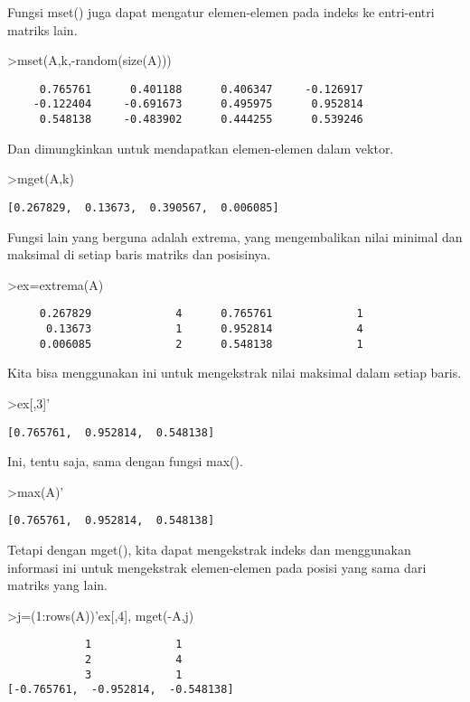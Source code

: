 \documentclass[
]{book}
\begin{document}
Fungsi mset() juga dapat mengatur elemen-elemen pada indeks ke entri-entri matriks lain.

\textgreater mset(A,k,-random(size(A)))

\begin{verbatim}
     0.765761      0.401188      0.406347     -0.126917 
    -0.122404     -0.691673      0.495975      0.952814 
     0.548138     -0.483902      0.444255      0.539246 
\end{verbatim}

Dan dimungkinkan untuk mendapatkan elemen-elemen dalam vektor.

\textgreater mget(A,k)

\begin{verbatim}
[0.267829,  0.13673,  0.390567,  0.006085]
\end{verbatim}

Fungsi lain yang berguna adalah extrema, yang mengembalikan nilai minimal dan maksimal di setiap baris matriks dan posisinya.

\textgreater ex=extrema(A)

\begin{verbatim}
     0.267829             4      0.765761             1 
      0.13673             1      0.952814             4 
     0.006085             2      0.548138             1 
\end{verbatim}

Kita bisa menggunakan ini untuk mengekstrak nilai maksimal dalam setiap baris.

\textgreater ex{[},3{]}'

\begin{verbatim}
[0.765761,  0.952814,  0.548138]
\end{verbatim}

Ini, tentu saja, sama dengan fungsi max().

\textgreater max(A)'

\begin{verbatim}
[0.765761,  0.952814,  0.548138]
\end{verbatim}

Tetapi dengan mget(), kita dapat mengekstrak indeks dan menggunakan informasi ini untuk mengekstrak elemen-elemen pada posisi yang sama dari matriks yang lain.

\textgreater j=(1:rows(A))'\textbar ex{[},4{]}, mget(-A,j)

\begin{verbatim}
            1             1 
            2             4 
            3             1 
[-0.765761,  -0.952814,  -0.548138]
\end{verbatim}
\end{document}
